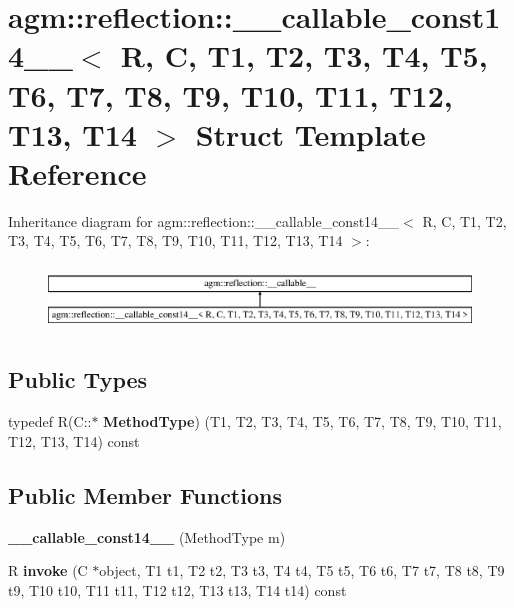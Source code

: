 \hypertarget{structagm_1_1reflection_1_1____callable__const14____}{}\section{agm\+:\+:reflection\+:\+:\+\_\+\+\_\+callable\+\_\+const14\+\_\+\+\_\+$<$ R, C, T1, T2, T3, T4, T5, T6, T7, T8, T9, T10, T11, T12, T13, T14 $>$ Struct Template Reference}
\label{structagm_1_1reflection_1_1____callable__const14____}
Inheritance diagram for agm\+:\+:reflection\+:\+:\+\_\+\+\_\+callable\+\_\+const14\+\_\+\+\_\+$<$ R, C, T1, T2, T3, T4, T5, T6, T7, T8, T9, T10, T11, T12, T13, T14 $>$\+:\begin{figure}[H]
\begin{center}
\leavevmode
\includegraphics[height=1.755486cm]{structagm_1_1reflection_1_1____callable__const14____}
\end{center}
\end{figure}
\subsection*{Public Types}
\begin{DoxyCompactItemize}
\item 
typedef R(C\+::$\ast$ {\bfseries Method\+Type}) (T1, T2, T3, T4, T5, T6, T7, T8, T9, T10, T11, T12, T13, T14) const \hypertarget{structagm_1_1reflection_1_1____callable__const14_____a81c2b4054df032dd3bd5effb183164b4}{}\label{structagm_1_1reflection_1_1____callable__const14_____a81c2b4054df032dd3bd5effb183164b4}

\end{DoxyCompactItemize}
\subsection*{Public Member Functions}
\begin{DoxyCompactItemize}
\item 
{\bfseries \+\_\+\+\_\+callable\+\_\+const14\+\_\+\+\_\+} (Method\+Type m)\hypertarget{structagm_1_1reflection_1_1____callable__const14_____ac827046f205c34da49e1c415f2092aaf}{}\label{structagm_1_1reflection_1_1____callable__const14_____ac827046f205c34da49e1c415f2092aaf}

\item 
R {\bfseries invoke} (C $\ast$object, T1 t1, T2 t2, T3 t3, T4 t4, T5 t5, T6 t6, T7 t7, T8 t8, T9 t9, T10 t10, T11 t11, T12 t12, T13 t13, T14 t14) const \hypertarget{structagm_1_1reflection_1_1____callable__const14_____a66dd1d847cfa9835dc2a05f870f02ccc}{}\label{structagm_1_1reflection_1_1____callable__const14_____a66dd1d847cfa9835dc2a05f870f02ccc}

\end{DoxyCompactItemize}
